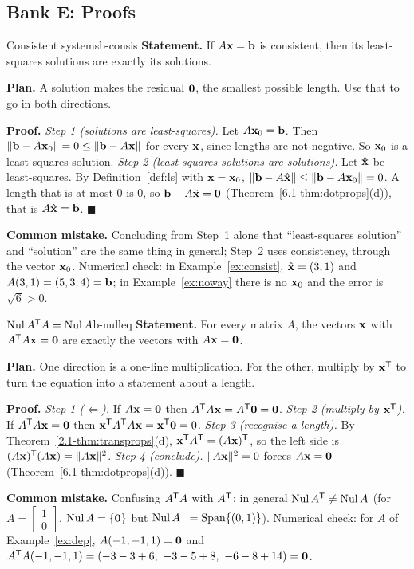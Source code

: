 \documentclass[11pt]{article}
\begin{document}
\subsection*{Bank E: Proofs}
\begin{exmp}{Consistent systems}{b-consis}
\textbf{Statement.} If $A\mathbf{x}=\mathbf{b}$ is consistent, then its least-squares solutions are exactly its solutions.

\textbf{Plan.} A solution makes the residual $\mathbf{0}$, the smallest possible length. Use that to go in both directions.

\textbf{Proof.}
\emph{Step 1 (solutions are least-squares).} Let $A\mathbf{x}_0=\mathbf{b}$. Then $\lVert\mathbf{b}-A\mathbf{x}_0\rVert=0\le\lVert\mathbf{b}-A\mathbf{x}\rVert$ for every $\mathbf{x}$, since lengths are not negative. So $\mathbf{x}_0$ is a least-squares solution.
\emph{Step 2 (least-squares solutions are solutions).} Let $\hat{\mathbf{x}}$ be least-squares. By Definition~\ref{def:ls} with $\mathbf{x}=\mathbf{x}_0$, $\lVert\mathbf{b}-A\hat{\mathbf{x}}\rVert\le\lVert\mathbf{b}-A\mathbf{x}_0\rVert=0$. A length that is at most $0$ is $0$, so $\mathbf{b}-A\hat{\mathbf{x}}=\mathbf{0}$ (Theorem~\ref{6.1-thm:dotprops}(d)), that is $A\hat{\mathbf{x}}=\mathbf{b}$. \qquad$\blacksquare$

\textbf{Common mistake.} Concluding from Step~1 alone that ``least-squares solution'' and ``solution'' are the same thing in general; Step~2 uses consistency, through the vector $\mathbf{x}_0$. Numerical check: in Example~\ref{ex:consist}, $\hat{\mathbf{x}}=(3,1)$ and $A(3,1)=(5,3,4)=\mathbf{b}$; in Example~\ref{ex:noway} there is no $\mathbf{x}_0$ and the error is $\sqrt6>0$.
\end{exmp}

\begin{exmp}{$\operatorname{Nul} A^{\mathsf T} A=\operatorname{Nul} A$}{b-nulleq}
\textbf{Statement.} For every matrix $A$, the vectors $\mathbf{x}$ with $A^{\mathsf T} A\mathbf{x}=\mathbf{0}$ are exactly the vectors with $A\mathbf{x}=\mathbf{0}$.

\textbf{Plan.} One direction is a one-line multiplication. For the other, multiply by $\mathbf{x}^{\mathsf T}$ to turn the equation into a statement about a length.

\textbf{Proof.}
\emph{Step 1 ($\Leftarrow$).} If $A\mathbf{x}=\mathbf{0}$ then $A^{\mathsf T} A\mathbf{x}=A^{\mathsf T}\mathbf{0}=\mathbf{0}$.
\emph{Step 2 (multiply by $\mathbf{x}^{\mathsf T}$).} If $A^{\mathsf T} A\mathbf{x}=\mathbf{0}$ then $\mathbf{x}^{\mathsf T} A^{\mathsf T} A\mathbf{x}=\mathbf{x}^{\mathsf T}\mathbf{0}=0$.
\emph{Step 3 (recognise a length).} By Theorem~\ref{2.1-thm:transprops}(d), $\mathbf{x}^{\mathsf T} A^{\mathsf T}=(A\mathbf{x})^{\mathsf T}$, so the left side is $(A\mathbf{x})^{\mathsf T}(A\mathbf{x})=\lVert A\mathbf{x}\rVert^2$.
\emph{Step 4 (conclude).} $\lVert A\mathbf{x}\rVert^2=0$ forces $A\mathbf{x}=\mathbf{0}$ (Theorem~\ref{6.1-thm:dotprops}(d)). \qquad$\blacksquare$

\textbf{Common mistake.} Confusing $A^{\mathsf T} A$ with $A^{\mathsf T}$: in general $\operatorname{Nul} A^{\mathsf T}\neq\operatorname{Nul} A$ (for $A=\begin{bmatrix}1\\0\end{bmatrix}$, $\operatorname{Nul} A=\{\mathbf{0}\}$ but $\operatorname{Nul} A^{\mathsf T}=\operatorname{Span}\{(0,1)\}$). Numerical check: for $A$ of Example~\ref{ex:dep}, $A(-1,-1,1)=\mathbf{0}$ and $A\T A(-1,-1,1)=(-3-3+6,\ -3-5+8,\ -6-8+14)=\bv{0}$.
\end{exmp}
\end{document}

